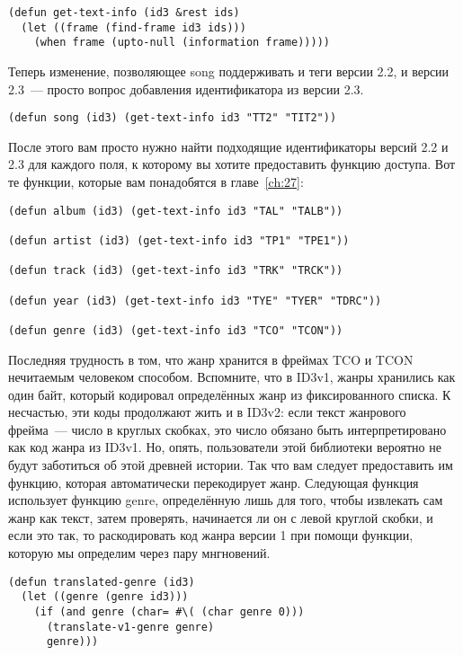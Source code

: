 \begin{lstlisting}
(defun get-text-info (id3 &rest ids)
  (let ((frame (find-frame id3 ids)))
    (when frame (upto-null (information frame)))))
\end{lstlisting}

Теперь изменение, позволяющее song поддерживать и теги версии 2.2, и версии 2.3~--- просто
вопрос добавления идентификатора из версии 2.3.

\begin{lstlisting}
(defun song (id3) (get-text-info id3 "TT2" "TIT2"))
\end{lstlisting}

После этого вам просто нужно найти подходящие идентификаторы версий 2.2 и 2.3 для каждого
поля, к которому вы хотите предоставить функцию доступа. Вот те функции, которые вам
понадобятся в главе~\ref{ch:27}:

\begin{lstlisting}
(defun album (id3) (get-text-info id3 "TAL" "TALB"))

(defun artist (id3) (get-text-info id3 "TP1" "TPE1"))

(defun track (id3) (get-text-info id3 "TRK" "TRCK"))

(defun year (id3) (get-text-info id3 "TYE" "TYER" "TDRC"))

(defun genre (id3) (get-text-info id3 "TCO" "TCON"))
\end{lstlisting}

Последняя трудность в том, что жанр хранится в фреймах TCO и TCON нечитаемым человеком
способом. Вспомните, что в ID3v1, жанры хранились как один байт, который кодировал
определённых жанр из фиксированного списка. К несчастью, эти коды продолжают жить и в
ID3v2: если текст жанрового фрейма~--- число в круглых скобках, это число обязано быть
интерпретировано как код жанра из ID3v1. Но, опять, пользователи этой библиотеки вероятно
не будут заботиться об этой древней истории. Так что вам следует предоставить им функцию,
которая автоматически перекодирует жанр. Следующая функция использует функцию genre,
определённую лишь для того, чтобы извлекать сам жанр как текст, затем проверять,
начинается ли он с левой круглой скобки, и если это так, то раскодировать код жанра версии
1 при помощи функции, которую мы определим через пару мнгновений.

\begin{lstlisting}
(defun translated-genre (id3)
  (let ((genre (genre id3)))
    (if (and genre (char= #\( (char genre 0)))
      (translate-v1-genre genre)
      genre)))
\end{lstlisting}

